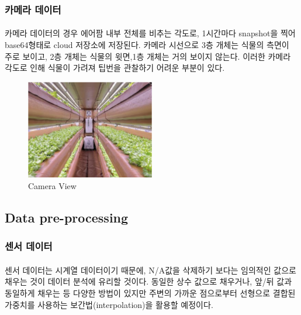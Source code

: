 \documentclass[11pt]{article}
\begin{document}
    \subsubsection{카메라 데이터}

    \paragraph{} 카메라 데이터의 경우 에어팜 내부 전체를 비추는 각도로, 1시간마다 snapshot을 찍어 base64형태로 cloud 저장소에 저장된다. 카메라 시선으로 3층 개체는 식물의 측면이 주로 보이고, 2층 개체는 식물의 윗면,1층 개체는 거의 보이지 않는다. 이러한 카메라 각도로 인해 식물이 가려져 팁번을 관찰하기 어려운 부분이 있다. 
    
    \begin{figure}[h]
    \centering
    \includegraphics[width=0.5\textwidth]{Latex_Proposal/images/camera_view.png} %
    \caption{Camera View}
    \label{fig:camera_view}
    \end{figure}

    
    \subsection{Data pre-processing}
    \subsubsection{센서 데이터}
    \paragraph{} 센서 데이터는 시계열 데이터이기 때문에, N/A값을 삭제하기 보다는 임의적인 값으로 채우는 것이 데이터 분석에 유리할 것이다. 동일한 상수 값으로 채우거나, 앞/뒤 값과 동일하게 채우는 등 다양한 방법이 있지만 주변의 가까운 점으로부터 선형으로 결합된 가중치를 사용하는 보간법(interpolation)을 활용할 예정이다. 
\end{document}
